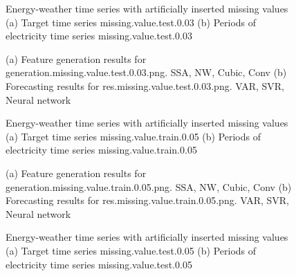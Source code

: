\documentclass[12pt]{article}
\begin{document}
\begin{figure}
\centering
{}
\caption{Energy-weather time series with artificially inserted missing values	(a) Target time series	missing.value.test.0.03	(b) Periods of electricity time series	missing.value.test.0.03	}
\end{figure}


\begin{figure}
\centering
{}
\caption{(a)	Feature generation results for	generation.missing.value.test.0.03.png.	SSA, NW, Cubic, Conv	(b)	Forecasting results for	res.missing.value.test.0.03.png.	VAR, SVR, Neural network	}
\end{figure}


\begin{figure}
\centering
{}
\caption{Energy-weather time series with artificially inserted missing values	(a) Target time series	missing.value.train.0.05	(b) Periods of electricity time series	missing.value.train.0.05	}
\end{figure}


\begin{figure}
\centering
{}
\caption{(a)	Feature generation results for	generation.missing.value.train.0.05.png.	SSA, NW, Cubic, Conv	(b)	Forecasting results for	res.missing.value.train.0.05.png.	VAR, SVR, Neural network	}
\end{figure}


\begin{figure}
\centering
{}
\caption{Energy-weather time series with artificially inserted missing values	(a) Target time series	missing.value.test.0.05	(b) Periods of electricity time series	missing.value.test.0.05	}
\end{figure}
\end{document}
